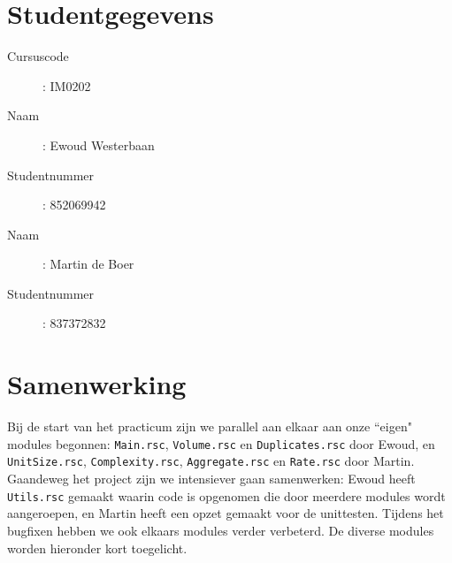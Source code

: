 \documentclass[a4paper]{article}
\begin{document}
\pagestyle{fancy}

\section*{Studentgegevens}
\begin{description}
	\item [Cursuscode]: IM0202
	\item [Naam]: Ewoud Westerbaan
	\item [Studentnummer]: 852069942
	\item [Naam]: Martin de Boer
	\item [Studentnummer]: 837372832
\end{description}

\section{Samenwerking}
Bij de start van het practicum zijn we parallel aan elkaar aan onze ``eigen" modules begonnen: \texttt{Main.rsc}, \texttt{Volume.rsc} en \texttt{Duplicates.rsc} door Ewoud, en \texttt{UnitSize.rsc}, \texttt{Complexity.rsc}, \texttt{Aggregate.rsc} en \texttt{Rate.rsc} door Martin. Gaandeweg het project zijn we intensiever gaan samenwerken: Ewoud heeft \texttt{Utils.rsc} gemaakt waarin code is opgenomen die door meerdere modules wordt aangeroepen, en Martin heeft een opzet gemaakt voor de unittesten. Tijdens het bugfixen hebben we ook elkaars modules verder verbeterd. De diverse modules worden hieronder kort toegelicht.
\end{document}
